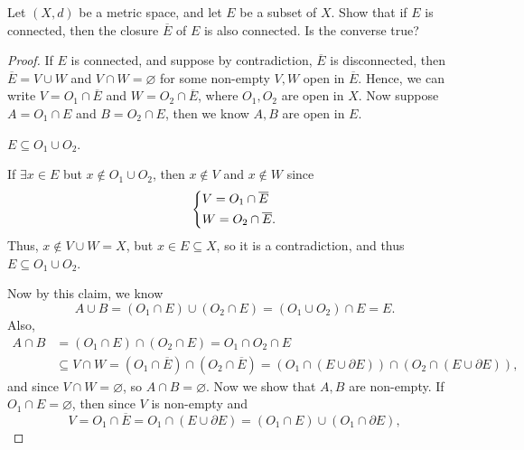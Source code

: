 \begin{problem}[15pts]
    Let $(X,d)$ be a metric space, and let $E$ be a subset of $X$.  
Show that if $E$ is connected, then the closure $\overline{E}$ of $E$ is also connected.  
Is the converse true?
\end{problem}
\begin{proof}
    If \(E\) is connected, and suppose by contradiction, \(\overline{E} \) is disconnected, then \(\overline{E} = V \cup W\) and \(V \cap W = \varnothing \) for some non-empty \(V, W\) open in \(\overline{E} \). Hence, we can write \(V = O_1 \cap \overline{E} \) and \(W = O_2 \cap \overline{E} \), where \(O_1, O_2\) are open in \(X\). Now suppose \(A = O_1 \cap E\) and \(B = O_2 \cap E\), then we know \(A, B\) are open in \(E\). 
    \begin{claim}
        \(E \subseteq O_1 \cup O_2\). 
    \end{claim}              
    \begin{explanation}
        If \(\exists x \in E\) but \(x \notin O_1 \cup O_2\), then \(x \notin V\) and \(x \notin W\) since 
        \[
            \begin{dcases}
                V = O_1 \cap \overline{E} \\
                W = O_2 \cap \overline{E} .       
            \end{dcases}
        \]    
        Thus, \(x \notin V \cup W = X\), but \(x \in E \subseteq X\), so it is a contradiction, and thus \(E \subseteq O_1 \cup O_2\).   
    \end{explanation}
    Now by this claim, we know
    \[
        A \cup B = \left( O_1 \cap E \right) \cup \left( O_2 \cap E \right) = \left( O_1 \cup O_2 \right) \cap E = E.   
    \]
    Also, 
    \begin{align*}
         A \cap B &= \left( O_1 \cap E \right) \cap \left( O_2 \cap E \right) = O_1 \cap O_2 \cap E \\ & \subseteq V \cap W = \left( O_1 \cap \overline{E}  \right) \cap \left( O_2 \cap \overline{E}  \right)  = \left( O_1 \cap \left( E \cup \partial E \right)   \right) \cap \left( O_2 \cap \left( E \cup \partial E \right)  \right),  
    \end{align*}
    and since \(V \cap W = \varnothing \), so \(A \cap B = \varnothing \). Now we show that \(A, B\) are non-empty. If \(O_1 \cap E = \varnothing \), then since \(V\) is non-empty and 
    \[
        V = O_1 \cap \overline{E} = O_1 \cap \left( E \cup \partial E \right) = (O_1 \cap E) \cup \left( O_1 \cap \partial E \right),    
\]
\end{proof}

